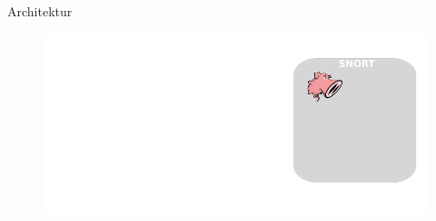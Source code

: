 \begin{frame}{Architektur}
    \begin{figure}
    	\centering
    	\includegraphics[width=\textwidth]{./images/1.pdf}
    \end{figure}
\end{frame}
